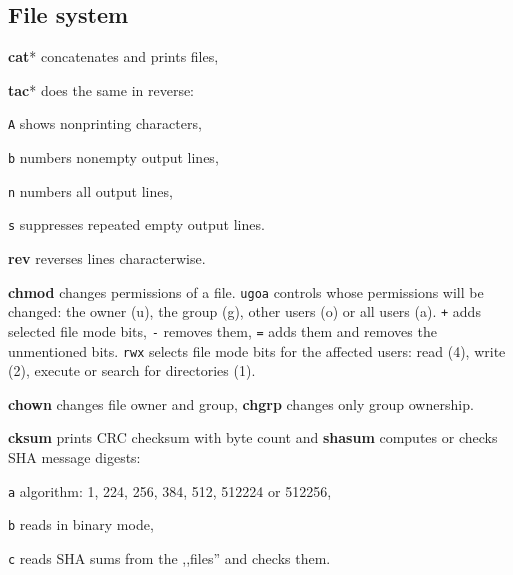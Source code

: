 \subsection*{File system}
\begin{enumx}
	\item [\cmd] \textbf{cat}* concatenates and prints files,
	
	\item [\cmd] \textbf{tac}* does the same in reverse: %
	\item [\texttt{A}] shows nonprinting characters,
	\item [\texttt{b}] numbers nonempty output lines,
	\item [\texttt{n}] numbers all output lines,
	\item [\texttt{s}] suppresses repeated empty output lines.
	
	\item [\cmd] \textbf{rev} reverses lines characterwise.
\end{enumx}

\textbf{chmod} changes permissions of a file.
\texttt{ugoa} controls whose permissions will be changed: 
the owner (u), the group (g), other users (o) or all users (a).
\texttt{+} adds selected file mode bits, \texttt{-} removes them, 
\texttt{=} adds them and removes the unmentioned bits.
\texttt{rwx} selects file mode bits for the affected users: 
read (4), write (2), execute or search for directories (1).

\textbf{chown} changes file owner and group,
\textbf{chgrp} changes only group ownership.

\textbf{cksum} prints CRC checksum with byte count and 
\textbf{shasum} computes or checks SHA message digests:
\begin{enumx}
	\item [\texttt{a}] algorithm: 1, 224, 256, 384, 512, 512224 or 512256,
	\item [\texttt{b}] reads in binary mode,
	\item [\texttt{c}] reads SHA sums from the ,,files'' and checks them.
\end{enumx}

